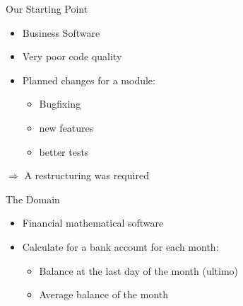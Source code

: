 
\begin{frame}[fragile]{Our Starting Point}
\begin{itemize}
\item Business Software
\item Very poor code quality
\item Planned changes for a module:
\begin{itemize}
\item Bugfixing
\item new features
\item better tests
\end{itemize}
\end{itemize}

$\Rightarrow$ A restructuring was required
\end{frame}

\begin{frame}[fragile]{The Domain}
\begin{itemize}
\item Financial mathematical software
\end{itemize}

\begin{itemize}
\item Calculate for a bank account for each month:
\begin{itemize}
\item Balance at the last day of the month (ultimo)
\item Average balance of the month
\end{itemize}
\end{itemize}

\end{frame}


